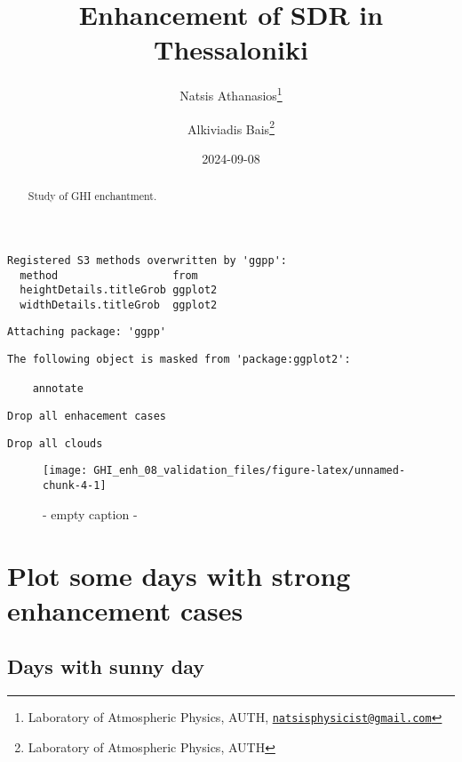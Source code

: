\documentclass[
  10pt,
  a4paper,oneside]{article}
\title{Enhancement of SDR in Thessaloniki}
\author{Natsis Athanasios\footnote{Laboratory of Atmospheric Physics, AUTH, \href{mailto:natsisphysicist@gmail.com}{\nolinkurl{natsisphysicist@gmail.com}}} \and Alkiviadis Bais\footnote{Laboratory of Atmospheric Physics, AUTH}}
\date{2024-09-08}
\begin{document}
\maketitle
\begin{abstract}
Study of GHI enchantment.
\end{abstract}

{
\hypersetup{linkcolor=}
\setcounter{tocdepth}{4}
\tableofcontents
}
\begin{verbatim}
Registered S3 methods overwritten by 'ggpp':
  method                  from   
  heightDetails.titleGrob ggplot2
  widthDetails.titleGrob  ggplot2
\end{verbatim}

\begin{verbatim}
Attaching package: 'ggpp'
\end{verbatim}

\begin{verbatim}
The following object is masked from 'package:ggplot2':

    annotate
\end{verbatim}

\begin{verbatim}
Drop all enhacement cases
\end{verbatim}

\begin{verbatim}
Drop all clouds
\end{verbatim}

\begin{figure}[H]

{\centering \texttt{[image: GHI\_enh\_08\_validation\_files/figure-latex/unnamed-chunk-4-1]} 

}

\caption{ - empty caption - }\label{fig:unnamed-chunk-4}
\end{figure}

\FloatBarrier

\hypertarget{plot-some-days-with-strong-enhancement-cases}{%
\section{Plot some days with strong enhancement cases}\label{plot-some-days-with-strong-enhancement-cases}}

\FloatBarrier

\hypertarget{days-with-sunny-day}{%
\subsection{Days with sunny day}\label{days-with-sunny-day}}
\end{document}
